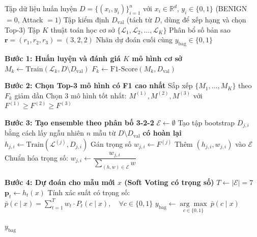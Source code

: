 \begin{algorithm}[htbp]
\caption{Hybrid Bagging Ensemble Learning}
\label{bagging_ag}
\begin{algorithmic}[1]
\Require Tập dữ liệu huấn luyện $D = \{(x_i, y_i)\}_{i=1}^{n}$ với $x_i \in \mathbb{R}^d$, $y_i \in \{0, 1\}$ (BENIGN $=0$, Attack $=1$)
\Statex \qquad Tập kiểm định $D_{\text{val}}$ (tách từ $D$, dùng để xếp hạng và chọn Top-3)
\Statex \qquad Tập $K$ thuật toán học cơ sở $\{\mathcal{L}_1, \mathcal{L}_2, \dots, \mathcal{L}_K\}$
\Statex \qquad Phân bổ số bản sao $\mathbf{r} = (r_1, r_2, r_3) = (3, 2, 2)$
\Ensure Nhãn dự đoán cuối cùng $y_{\text{bag}} \in \{0, 1\}$

\State \textbf{Bước 1: Huấn luyện và đánh giá $K$ mô hình cơ sở}
    \State $M_k \gets \text{Train}(\mathcal{L}_k, D \setminus D_{\text{val}})$ 
    \State $F_k \gets \text{F1-Score}(M_k, D_{\text{val}})$ 
\EndFor

\State \textbf{Bước 2: Chọn Top-3 mô hình có F1 cao nhất}
\State Sắp xếp $\{M_1, \dots, M_K\}$ theo $F_k$ giảm dần
\State Chọn 3 mô hình tốt nhất: $M^{(1)}, M^{(2)}, M^{(3)}$ với $F^{(1)} \geq F^{(2)} \geq F^{(3)}$

\State \textbf{Bước 3: Tạo ensemble theo phân bố 3-2-2}
\State $\mathcal{E} \gets \emptyset$ 
        \State Tạo tập bootstrap $D_{j,i}$ bằng cách lấy ngẫu nhiên $n$ mẫu từ $D \setminus D_{\text{val}}$ \textbf{có hoàn lại}
        \State $h_{j,i} \gets \text{Train}(\mathcal{L}^{(j)}, D_{j,i})$ 
        \State Gán trọng số $w_{j,i} \gets F^{(j)}$ 
        \State Thêm $(h_{j,i}, w_{j,i})$ vào $\mathcal{E}$
    \EndFor
\EndFor
\State Chuẩn hóa trọng số: $w_{j,i} \gets \dfrac{w_{j,i}}{\sum_{(h, w) \in \mathcal{E}} w}$

\State \textbf{Bước 4: Dự đoán cho mẫu mới $x$ (Soft Voting có trọng số)}
\State $T \gets |\mathcal{E}| = 7$ 
    \State $\mathbf{p}_t \gets h_t(x)$ 
\EndFor
\State Tính xác suất có trọng số: $\bar{p}(c \mid x) = \displaystyle\sum_{t=1}^{T} w_t \cdot P_t(c \mid x), \quad \forall c \in \{0, 1\}$
\State $y_{\text{bag}} \gets \underset{c \in \{0, 1\}}{\arg\max} \ \bar{p}(c \mid x)$

\State \Return $y_{\text{bag}}$
\end{algorithmic}
\end{algorithm}



